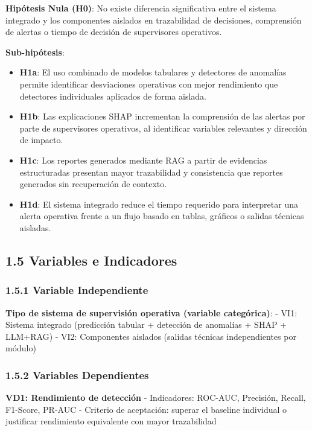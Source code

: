 \textbf{Hipótesis Nula (H0)}: No existe diferencia significativa entre
el sistema integrado y los componentes aislados en trazabilidad de
decisiones, comprensión de alertas o tiempo de decisión de supervisores
operativos.

\textbf{Sub-hipótesis}:

\begin{itemize}
\tightlist
\item
  \textbf{H1a}: El uso combinado de modelos tabulares y detectores de
  anomalías permite identificar desviaciones operativas con mejor
  rendimiento que detectores individuales aplicados de forma aislada.
\item
  \textbf{H1b}: Las explicaciones SHAP incrementan la comprensión de las
  alertas por parte de supervisores operativos, al identificar variables
  relevantes y dirección de impacto.
\item
  \textbf{H1c}: Los reportes generados mediante RAG a partir de
  evidencias estructuradas presentan mayor trazabilidad y consistencia
  que reportes generados sin recuperación de contexto.
\item
  \textbf{H1d}: El sistema integrado reduce el tiempo requerido para
  interpretar una alerta operativa frente a un flujo basado en tablas,
  gráficos o salidas técnicas aisladas.
\end{itemize}

\subsection{1.5 Variables e Indicadores}\label{variables-e-indicadores}

\subsubsection{1.5.1 Variable
Independiente}\label{variable-independiente}

\textbf{Tipo de sistema de supervisión operativa (variable categórica)}:
- VI1: Sistema integrado (predicción tabular + detección de anomalías +
SHAP + LLM+RAG) - VI2: Componentes aislados (salidas técnicas
independientes por módulo)

\subsubsection{1.5.2 Variables
Dependientes}\label{variables-dependientes}

\textbf{VD1: Rendimiento de detección} - Indicadores: ROC-AUC,
Precisión, Recall, F1-Score, PR-AUC - Criterio de aceptación: superar el
baseline individual o justificar rendimiento equivalente con mayor
trazabilidad

